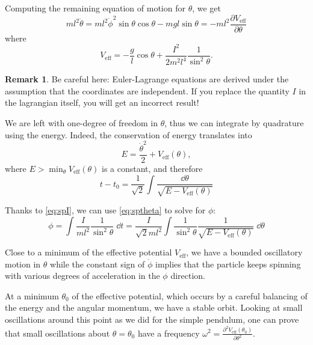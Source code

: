 \documentclass[english,fontsize=11pt,paper=b5]{scrbook}
\theoremstyle{definition}
\newtheorem{remark}{Remark}[chapter]
\begin{document}
    Computing the remaining equation of motion for $\theta$, we get
    \begin{equation}
      ml^2 \ddot \theta = ml^2 \dot\phi^2\sin\theta\cos\theta - mgl \sin\theta = -ml^2\frac{\partial V_{\mathrm{eff}}}{\partial \theta}
    \end{equation}
    where
    \begin{equation}
      V_{\mathrm{eff}} = -\frac{g}l\cos\theta + \frac{I^2}{2m^2l^4}\frac1{\sin^2\theta}.
    \end{equation}

    \begin{remark}
      Be careful here: Euler-Lagrange equations are derived under the assumption that the coordinates are independent. If you replace the quantity $I$ in the lagrangian itself, you will get an incorrect result!
    \end{remark}

    We are left with one-degree of freedom in $\theta$, thus we can integrate by quadrature using the energy.
    Indeed, the conservation of energy translates into
    \begin{equation}
      E = \frac{\dot \theta^2}2 + V_{\mathrm{eff}}(\theta),
    \end{equation}
    where $E>\min_\theta V_{\mathrm{eff}}(\theta)$ is a constant, and therefore
    \begin{equation}\label{eq:sptheta}
      t - t_0 = \frac1{\sqrt2}\int\frac{\dd \theta}{\sqrt{E - V_{\mathrm{eff}}(\theta)}}
    \end{equation}

    Thanks to \eqref{eq:spI}, we can use \eqref{eq:sptheta} to solve for $\phi$:
    \begin{equation}
      \phi = \int \frac{I}{ml^2} \frac1{\sin^2\theta} \;\dd t
      = \frac{I}{\sqrt{2} m l^2}  \int \frac1{\sin^2\theta} \frac{1}{\sqrt{E - V_{\mathrm{eff}}(\theta)}}\; \dd \theta
    \end{equation}

    Close to a minimum of the effective potential $V_{\mathrm{eff}}$, we have a bounded oscillatory motion in $\theta$ while the constant sign of $\dot\phi$ implies that the particle keeps spinning with various degrees of acceleration in the $\phi$ direction.

    At a minimum $\theta_0$ of the effective potential, which occurs by a careful balancing of the energy and the angular momentum, we have a stable orbit.
    Looking at small oscillations around this point as we did for the simple pendulum, one can prove that small oscillations about $\theta = \theta_0$ have a frequency $\omega^2 = \frac{\partial^2 V_{\mathrm{eff}}(\theta_0)}{\partial\theta^2}$.
\end{document}

